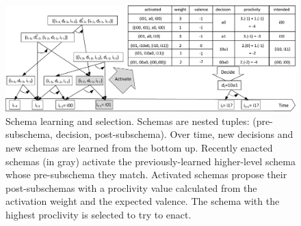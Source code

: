 \documentclass[runningheads]{llncs}
\begin{document}
\begin{figure}
	\centering
	\includegraphics[width=1.0\textwidth]{Figure_3_agent8.pdf}
	\caption{Schema learning and selection.
		Schemas are nested tuples: (pre-subschema, decision, post-subschema).
		Over time, new decisions and new schemas are learned from the bottom up. 
		Recently enacted schemas (in gray) activate the previously-learned higher-level schema whose pre-subschema they match.
		Activated schemas propose their post-subschemas with a proclivity value calculated from the activation weight and the expected valence.
		The schema with the highest proclivity is selected to try to enact.} 
	\label{fig:agent8}
\end{figure}


\end{document}
